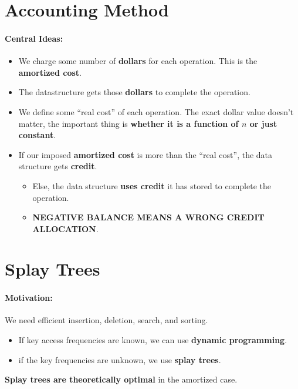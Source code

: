 \documentclass[a4paper,12pt]{report}
\begin{document}
\section{Accounting Method}

\paragraph{Central Ideas:} 
\begin{itemize}
\item We charge some number of \textbf{dollars} for each operation. This is the \textbf{amortized cost}.
\item The datastructure gets those \textbf{dollars} to complete the operation.
\item We define some ``real cost'' of each operation. The exact dollar value doesn't matter, the important thing is \textbf{whether it is a function of $n$ or just constant}.
\item If our imposed \textbf{amortized cost} is more than the ``real cost'', the data structure gets \textbf{credit}.
\begin{itemize}
\item Else, the data structure \textbf{uses credit} it has stored to complete the operation.
\item \textbf{NEGATIVE BALANCE MEANS A WRONG CREDIT ALLOCATION}.
\end{itemize}
\end{itemize}






\section{Splay Trees}

\paragraph{Motivation: } We need efficient insertion, deletion, search, and sorting.
\begin{itemize}
\item If key access frequencies are known, we can use \textbf{dynamic programming}.
\item if the key frequencies are unknown, we use \textbf{splay trees}.
\end{itemize}

\textbf{Splay trees are theoretically optimal} in the amortized case. 
\end{document}
